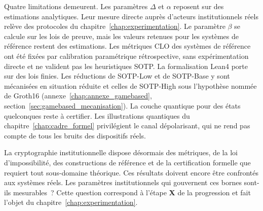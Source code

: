 \begin{sloppypar}
Quatre limitations demeurent. Les param\`etres
$\Delta$ et $\alpha$ reposent sur des estimations analytiques. Leur mesure directe aupr\`es
d'acteurs institutionnels r\'eels rel\`eve des protocoles du
chapitre~\ref{chap:experimentation}. Le param\`etre $\beta$ se calcule sur les lois de preuve,
mais les valeurs retenues pour les syst\`emes de r\'ef\'erence restent des estimations. Les m\'etriques CLO
des syst\`emes de r\'ef\'erence ont \'et\'e fix\'ees par calibration param\'etrique
r\'etrospective, sans exp\'erimentation directe et ne valident pas les
heuristiques SOTP. La formalisation Lean4 porte sur des lois finies. Les r\'eductions de
SOTP-Low et de SOTP-Base y sont m\'ecanis\'ees en situation r\'eduite et celles de SOTP-High sous
l'hypoth\`ese nomm\'ee de Groth16 (annexe~\ref{chap:annexe_gamebased},
section~\ref{sec:gamebased_mecanisation}). La couche quantique pour des \'etats quelconques reste
\`a certifier. Les illustrations quantiques du
chapitre~\ref{chap:cadre_formel} privil\'egient le canal d\'epolarisant, qui ne rend pas compte de tous les
bruits des dispositifs r\'eels.

La cryptographie institutionnelle dispose d\'esormais des m\'etriques, de la
loi d'impossibilit\'e, des constructions de r\'ef\'erence et de la certification
formelle que requiert tout sous-domaine th\'eorique. Ces r\'esultats doivent
encore \^etre confront\'es aux syst\`emes r\'eels. Les param\`etres institutionnels qui gouvernent ces bornes
sont-ils mesurables~?
Cette question correspond \`a l'\'etape \textbf{X} de la progression et fait
l'objet du chapitre~\ref{chap:experimentation}.
\end{sloppypar}
